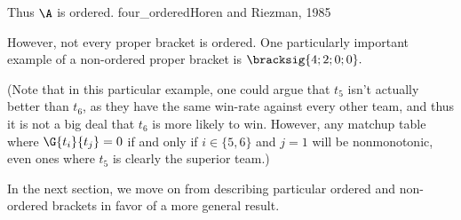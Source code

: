 {{    Thus $\A$ is ordered.
    }{four_ordered}{Horen and Riezman, 1985}

    However, not every proper bracket is ordered. One particularly important example of a non-ordered proper bracket is $\bracksig{4;2;0;0}.$


    (Note that in this particular example, one could argue that $t_5$ isn't actually better than $t_6$, as they have the same win-rate against every other team, and thus it is not a big deal that $t_6$ is more likely to win. However, any matchup table where $\G{t_i}{t_j} = 0$ if and only if $i \in \{5, 6\}$ and $j = 1$ will be nonmonotonic, even ones where $t_5$ is clearly the superior team.)

    In the next section, we move on from describing particular ordered and non-ordered brackets in favor of a more general result.
}